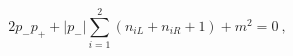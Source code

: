\begin{equation}
 2 p_- p_+ + | p_- | \sum_{i=1}^2 (n_{iL} + n_{iR} + 1 ) + m^2 = 0 ~,
\label{disp}
\end{equation} 
